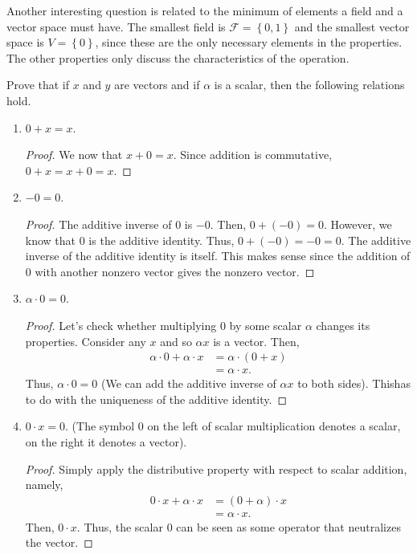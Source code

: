\documentclass[12pt]{article}
\newenvironment{problem}[2][Problem]{\begin{trivlist} \item[\hskip \labelsep {\bfseries #1}\hskip \labelsep {\bfseries #2.}]}{\end{trivlist}}
\begin{document}
Another interesting question is related to the minimum of elements a field and a vector space must have. The smallest field is $\mathcal{F} = \left\{ 0,1 \right\}$ and the smallest vector space is $V=\left\{ 0 \right\}$, since these are the only necessary elements in the properties. The other properties only discuss the characteristics of the operation.  
\begin{problem}{1}
  Prove that if $x$ and $y$ are vectors and if $\alpha$ is a scalar, then the following relations hold.
\begin{enumerate}
  \item $0+x=x$.
\begin{proof}
  We now that $x+0=x$. Since addition is commutative, $0+x=x+0=x$.
\end{proof}
\item $-0 = 0$.
\begin{proof}
  The additive inverse of $0$ is $-0$. Then, $0+(-0)=0$. However, we know that $0$ is the additive identity. Thus, $0+(-0) = -0 = 0$. The additive inverse of the additive identity is itself. This makes sense since the addition of $0$ with another nonzero vector gives the nonzero vector. 
\end{proof}
\item $\alpha \cdot 0 = 0$.
\begin{proof}
  Let's check whether multiplying $0$ by some scalar $\alpha$ changes its properties. Consider any $x$ and so $\alpha x$ is a vector. Then,
\begin{align*}
  \alpha\cdot 0 + \alpha\cdot x &= \alpha \cdot ( 0 + x)\\
  &= \alpha \cdot x.
\end{align*}
Thus, $\alpha\cdot 0 = 0$ (We can add the additive inverse of $\alpha x$ to both sides). Thishas to do with the uniqueness of the additive identity.
\end{proof}
\item $0\cdot x = 0$. (The symbol $0$ on the left of scalar multiplication denotes a scalar, on the right it denotes a vector).
\begin{proof}
  Simply apply the distributive property with respect to scalar addition, namely, 
\begin{align*}
  0\cdot x + \alpha \cdot x &= (0+\alpha)\cdot x\\
  &= \alpha \cdot x.
\end{align*}
Then, $0\cdot x$. Thus, the scalar $0$ can be seen as some operator that neutralizes the vector. 
\end{proof}

\end{enumerate}
\end{problem}
\end{document}
